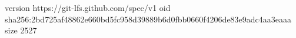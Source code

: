 version https://git-lfs.github.com/spec/v1
oid sha256:2bd725af48862e660bd5fc958d39889b6d0fbb0660f4206de83e9adc4aa3eaaa
size 2527
